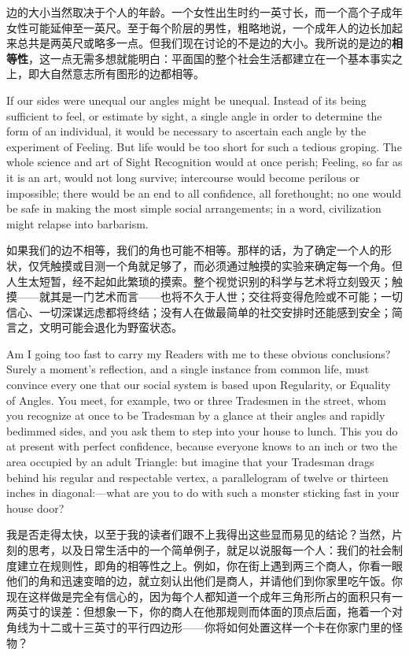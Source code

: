 \documentclass[12pt,UTF8]{ctexbook}
\begin{document}
边的大小当然取决于个人的年龄。一个女性出生时约一英寸长，而一个高个子成年女性可能延伸至一英尺。至于每个阶层的男性，粗略地说，一个成年人的边长加起来总共是两英尺或略多一点。但我们现在讨论的不是边的大小。我所说的是边的\textbf{相等性}，这一点无需多想就能明白：平面国的整个社会生活都建立在一个基本事实之上，即大自然意志所有图形的边都相等。

If our sides were unequal our angles might be unequal. Instead of its being sufficient to feel, or estimate by sight, a single angle in order to determine the form of an individual, it would be necessary to ascertain each angle by the experiment of Feeling. But life would be too short for such a tedious groping. The whole science and art of Sight Recognition would at once perish; Feeling, so far as it is an art, would not long survive; intercourse would become perilous or impossible; there would be an end to all confidence, all forethought; no one would be safe in making the most simple social arrangements; in a word, civilization might relapse into barbarism.

如果我们的边不相等，我们的角也可能不相等。那样的话，为了确定一个人的形状，仅凭触摸或目测一个角就足够了，而必须通过触摸的实验来确定每一个角。但人生太短暂，经不起如此繁琐的摸索。整个视觉识别的科学与艺术将立刻毁灭；触摸——就其是一门艺术而言——也将不久于人世；交往将变得危险或不可能；一切信心、一切深谋远虑都将终结；没有人在做最简单的社交安排时还能感到安全；简言之，文明可能会退化为野蛮状态。

Am I going too fast to carry my Readers with me to these obvious conclusions? Surely a moment's reflection, and a single instance from common life, must convince every one that our social system is based upon Regularity, or Equality of Angles. You meet, for example, two or three Tradesmen in the street, whom you recognize at once to be Tradesman by a glance at their angles and rapidly bedimmed sides, and you ask them to step into your house to lunch. This you do at present with perfect confidence, because everyone knows to an inch or two the area occupied by an adult Triangle: but imagine that your Tradesman drags behind his regular and respectable vertex, a parallelogram of twelve or thirteen inches in diagonal:---what are you to do with such a monster sticking fast in your house door?

我是否走得太快，以至于我的读者们跟不上我得出这些显而易见的结论？当然，片刻的思考，以及日常生活中的一个简单例子，就足以说服每一个人：我们的社会制度建立在规则性，即角的相等性之上。例如，你在街上遇到两三个商人，你看一眼他们的角和迅速变暗的边，就立刻认出他们是商人，并请他们到你家里吃午饭。你现在这样做是完全有信心的，因为每个人都知道一个成年三角形所占的面积只有一两英寸的误差：但想象一下，你的商人在他那规则而体面的顶点后面，拖着一个对角线为十二或十三英寸的平行四边形——你将如何处置这样一个卡在你家门里的怪物？
\end{document}
